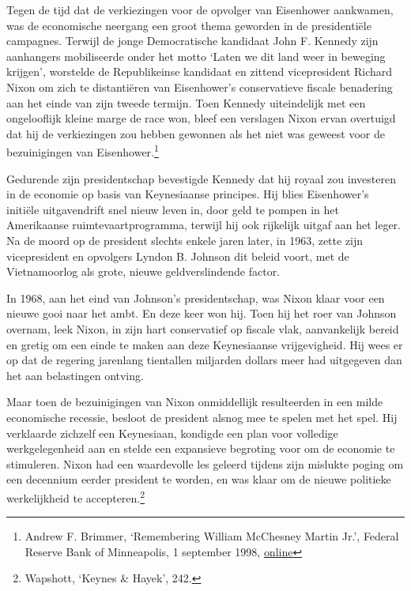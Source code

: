 \documentclass[smalldemyvopaper,11pt,twoside,onecolumn,openright,extrafontsizes,hidelinks]{memoir}
\begin{document}
Tegen de tijd dat de verkiezingen voor de opvolger van Eisenhower
aankwamen, was de economische neergang een groot thema geworden in de
presidentiële campagnes. Terwijl de jonge Democratische kandidaat John
F. Kennedy zijn aanhangers mobiliseerde onder het motto `Laten we dit
land weer in beweging krijgen', worstelde de Republikeinse kandidaat en
zittend vicepresident Richard Nixon om zich te distantiëren van
Eisenhower's conservatieve fiscale benadering aan het einde van zijn
tweede termijn. Toen Kennedy uiteindelijk met een ongelooflijk kleine
marge de race won, bleef een verslagen Nixon ervan overtuigd dat hij de
verkiezingen zou hebben gewonnen als het niet was geweest voor de
bezuinigingen van Eisenhower.\footnote{\hspace{0pt}Andrew F. Brimmer,
  `Remembering William McChesney Martin Jr.', Federal Reserve Bank of
  Minneapolis, 1 september 1998,
  \href{https://www.minneapolisfed.org/article/1998/remembering-william-mcchesney-martin-jr.}{online}}

Gedurende zijn presidentschap bevestigde Kennedy dat hij royaal zou
investeren in de economie op basis van Keynesiaanse principes. Hij blies
Eisenhower's initiële uitgavendrift snel nieuw leven in, door geld te
pompen in het Amerikaanse ruimtevaartprogramma, terwijl hij ook
rijkelijk uitgaf aan het leger. Na de moord op de president slechts
enkele jaren later, in 1963, zette zijn vicepresident en opvolgers
Lyndon B. Johnson dit beleid voort, met de Vietnamoorlog als grote,
nieuwe geldverslindende factor.

In 1968, aan het eind van Johnson's presidentschap, was Nixon klaar voor
een nieuwe gooi naar het ambt. En deze keer won hij. Toen hij het roer
van Johnson overnam, leek Nixon, in zijn hart conservatief op fiscale
vlak, aanvankelijk bereid en gretig om een einde te maken aan deze
Keynesiaanse vrijgevigheid. Hij wees er op dat de regering jarenlang
tientallen miljarden dollars meer had uitgegeven dan het aan belastingen
ontving.

Maar toen de bezuinigingen van Nixon onmiddellijk resulteerden in een
milde economische recessie, besloot de president alsnog mee te spelen
met het spel. Hij verklaarde zichzelf een Keynesiaan, kondigde een plan
voor volledige werkgelegenheid aan en stelde een expansieve begroting
voor om de economie te stimuleren. Nixon had een waardevolle les geleerd
tijdens zijn mislukte poging om een decennium eerder president te
worden, en was klaar om de nieuwe politieke werkelijkheid te
accepteren.\footnote{\hspace{0pt}Wapshott, `Keynes \& Hayek', 242.}
\end{document}
